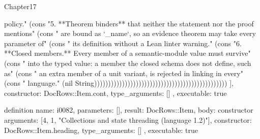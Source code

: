 \begin{lexlean}{Chapter17}
\begin{semanticmodule}
{{policy." (cons "5. **Theorem binders** that neither the statement nor the proof mentions" (cons "   are bound as `_name`, so an evidence theorem may take every parameter of" (cons "   its definition without a Lean linter warning." (cons "6. **Closed members.** Every member of a semantic-module value must survive" (cons "   into the typed value: a member the closed schema does not define, such as" (cons "   an extra member of a unit variant, is rejected in linking in every" (cons "   language." (nil String))))))))))))))))))))))))))))))))))))))))))))))))
    ],
    constructor: DocRows::Item.cont,
    type_arguments: []
  },
  executable: true
}

definition{
  name: i0082,
  parameters: [],
  result: DocRows::Item,
  body: constructor{
    arguments: [4, 1, "Collections and state threading (language 1.2)"],
    constructor: DocRows::Item.heading,
    type_arguments: []
  },
  executable: true
}


\end{semanticmodule}
\end{lexlean}
